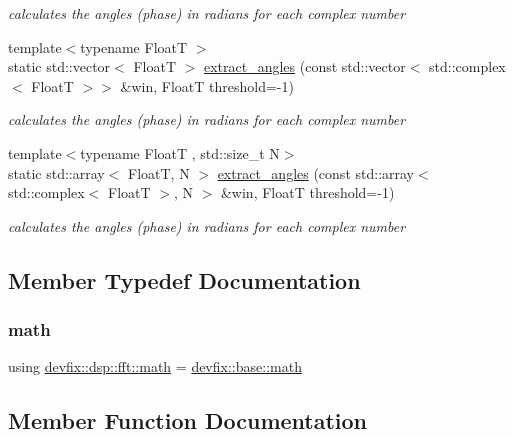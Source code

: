 \begin{DoxyCompactItemize}
\begin{DoxyCompactList}\small\item\em calculates the angles (phase) in radians for each complex number \end{DoxyCompactList}\item 
{\footnotesize template$<$typename FloatT $>$ }\\static std\+::vector$<$ FloatT $>$ \hyperlink{structdevfix_1_1dsp_1_1fft_a7f34943ae3b66b6cf77b397f1a1c2386}{extract\+\_\+angles} (const std\+::vector$<$ std\+::complex$<$ FloatT $>$$>$ \&win, FloatT threshold=-\/1)
\begin{DoxyCompactList}\small\item\em calculates the angles (phase) in radians for each complex number \end{DoxyCompactList}\item 
{\footnotesize template$<$typename FloatT , std\+::size\+\_\+t N$>$ }\\static std\+::array$<$ FloatT, N $>$ \hyperlink{structdevfix_1_1dsp_1_1fft_a34854b817edfebadae41362b399c7f34}{extract\+\_\+angles} (const std\+::array$<$ std\+::complex$<$ FloatT $>$, N $>$ \&win, FloatT threshold=-\/1)
\begin{DoxyCompactList}\small\item\em calculates the angles (phase) in radians for each complex number \end{DoxyCompactList}\end{DoxyCompactItemize}


\subsection{Member Typedef Documentation}
\mbox{\label{structdevfix_1_1dsp_1_1fft_a466499f45d4ae1240f5ba7e8c44a4691}} 
\subsubsection{\texorpdfstring{math}{math}}
{\footnotesize\ttfamily using \hyperlink{structdevfix_1_1dsp_1_1fft_a466499f45d4ae1240f5ba7e8c44a4691}{devfix\+::dsp\+::fft\+::math} =  \hyperlink{structdevfix_1_1base_1_1math}{devfix\+::base\+::math}}



\subsection{Member Function Documentation}
\mbox{\label{structdevfix_1_1dsp_1_1fft_a6ed95d078d9828e160e6d9911c253b5f}} 
